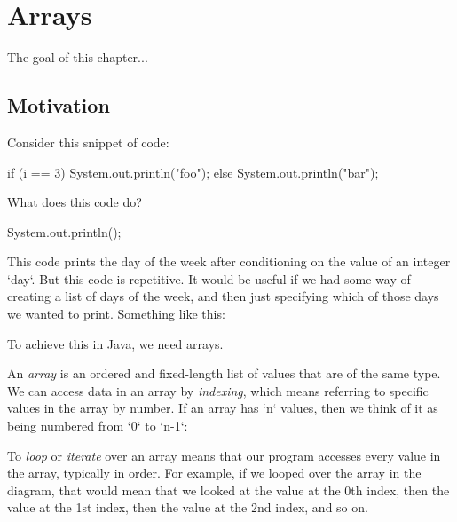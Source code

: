 \chapter{Arrays}

The goal of this chapter...

\section{Motivation}

Consider this snippet of code:

\begin{code}
if (i == 3) System.out.println("foo");
else System.out.println("bar");
\end{code}

\begin{example}
What does this code do?

\begin{code}
System.out.println();
\end{code}

This code prints the day of the week after conditioning on the value of an integer `day`. But this code is repetitive. It would be useful if we had some way of creating a list of days of the week, and then just specifying which of those days we wanted to print. Something like this:
\end{example}

To achieve this in Java, we need arrays.

\begin{definition}
An \emph{array} is an ordered and fixed-length list of values that are of the same type. We can access data in an array by \emph{indexing}, which means referring to specific values in the array by number. If an array has `n` values, then we think of it as being numbered from `0` to `n-1`:



\end{definition}

To \emph{loop} or \emph{iterate} over an array means that our program accesses every value in the array, typically in order. For example, if we looped over the array in the diagram, that would mean that we looked at the value at the 0th index, then the value at the 1st index, then the value at the 2nd index, and so on.

